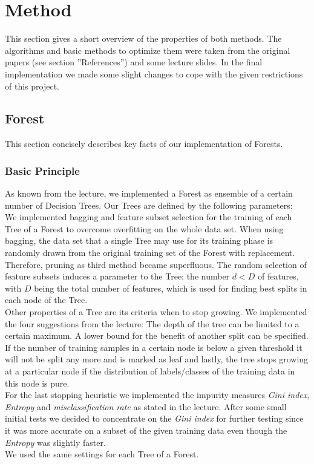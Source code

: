 \documentclass[twocolumn]{article}
\begin{document}
\section{Method}
This section gives a short overview of the properties of both methods. The algorithms and basic methods to optimize them were taken from the original papers (see section ''References'') and some lecture slides. In the final implementation we made some slight changes to cope with the given restrictions of this project.

\subsection{Forest}
This section concisely describes key facts of our implementation of Forests.

\subsubsection{Basic Principle}
As known from the lecture, we implemented a Forest as ensemble of a certain number of Decision Trees. Our Trees are defined by the following parameters:\\
We implemented bagging and feature subset selection for the training of each Tree of a Forest to overcome overfitting on the whole data set. When using bagging, the data set that a single Tree may use for its training phase is randomly drawn from the original training set of the Forest with replacement. Therefore, pruning as third method became superfluous. The random selection of feature subsets induces a parameter to the Tree: the number $d<D$ of features, with $D$ being the total number of features, which is used for finding best splits in each node of the Tree.\\
Other properties of a Tree are its criteria when to stop growing. We implemented the four suggestions from the lecture: The depth of the tree can be limited to a certain maximum. A lower bound for the benefit of another split can be specified. If the number of training samples in a certain node is below a given threshold it will not be split any more and is marked as leaf and lastly, the tree stops growing at a particular node if the distribution of labels/classes of the training data in this node is pure.\\
For the last stopping heuristic we implemented the impurity measures \textit{Gini index}, \textit{Entropy} and \textit{misclassification rate} as stated in the lecture. After some small initial tests we decided to concentrate on the \textit{Gini index} for further testing since it was more accurate on a subset of the given training data even though the \textit{Entropy} was slightly faster.\\
We used the same settings for each Tree of a Forest.
\end{document}
